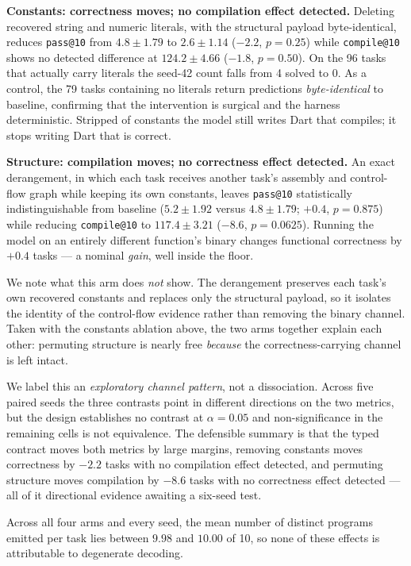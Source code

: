 \documentclass[conference]{IEEEtran}
\makeatletter
\newcommand{\passat}[1]{\texttt{pass@#1}\xspace}
\newcommand{\compileat}[1]{\texttt{compile@#1}\xspace}
\makeatother
\begin{document}
\textbf{Constants: correctness moves; no compilation effect detected.} Deleting recovered string and numeric
literals, with the structural payload byte-identical, reduces \passat{10} from
$4.8\pm1.79$ to $2.6\pm1.14$ ($-2.2$, $p=0.25$) while \compileat{10} shows no
detected difference at $124.2\pm4.66$ ($-1.8$, $p=0.50$). On the 96 tasks
that actually carry literals the seed-42 count falls from 4 solved to 0. As a
control, the 79 tasks containing no literals return predictions
\emph{byte-identical} to baseline, confirming that the intervention is surgical
and the harness deterministic. Stripped of constants the model still writes
Dart that compiles; it stops writing Dart that is correct.

\textbf{Structure: compilation moves; no correctness effect detected.} An exact derangement, in which each
task receives another task's assembly and control-flow graph while keeping its
own constants, leaves \passat{10} statistically indistinguishable from baseline
($5.2\pm1.92$ versus $4.8\pm1.79$; $+0.4$, $p=0.875$) while reducing
\compileat{10} to $117.4\pm3.21$ ($-8.6$, $p=0.0625$). Running the model on an
entirely different function's binary changes functional correctness by
$+0.4$ tasks --- a nominal \emph{gain}, well inside the floor.

We note what this arm does \emph{not} show. The derangement preserves each
task's own recovered constants and replaces only the structural payload, so it
isolates the identity of the control-flow evidence rather than removing the
binary channel. Taken with the constants ablation above, the two arms together
explain each other: permuting structure is nearly free \emph{because} the
correctness-carrying channel is left intact.

We label this an \emph{exploratory channel pattern}, not a dissociation. Across
five paired seeds the three contrasts point in different directions on the two
metrics, but the design establishes no contrast at $\alpha{=}0.05$ and
non-significance in the remaining cells is not equivalence. The defensible
summary is that the typed contract moves both metrics by large margins, removing
constants moves correctness by $-2.2$ tasks with no compilation effect detected,
and permuting structure moves compilation by $-8.6$ tasks with no correctness
effect detected --- all of it directional evidence awaiting a six-seed test.

Across all four arms and every seed, the mean number of distinct programs emitted
per task lies between $9.98$ and $10.00$ of 10, so none of these effects is
attributable to degenerate decoding.
\end{document}

